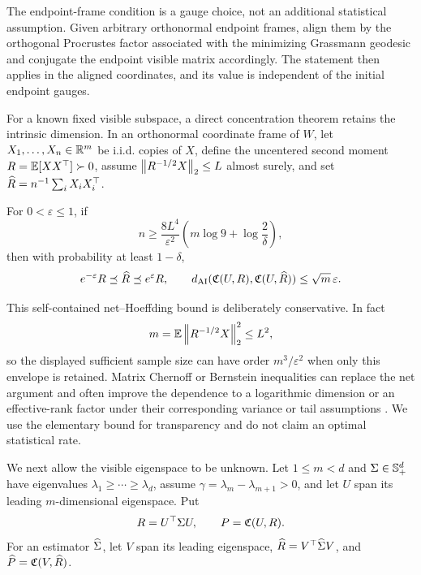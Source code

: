 The endpoint-frame condition is a gauge choice, not an additional statistical
assumption.  Given arbitrary orthonormal endpoint frames, align them by the
orthogonal Procrustes factor associated with the minimizing Grassmann geodesic
and conjugate the endpoint visible matrix accordingly.  The statement then
applies in the aligned coordinates, and its value is independent of the
initial endpoint gauges.

For a known fixed visible subspace, a direct concentration theorem retains
the intrinsic dimension.  In an orthonormal coordinate frame of \(W\), let
\(X_1,\ldots,X_n\in\mathbb R^m\) be i.i.d. copies of \(X\), define the uncentered
second moment \(R=\mathbb E[XX^\top]\succ0\), assume
\(\left\lVert R^{-1/2}X\right\rVert_2\le L\) almost surely, and set
\(\widehat R=n^{-1}\sum_iX_iX_i^\top\).

\begin{theorem}
\label{thm:known-subspace-recovery}
For \(0<\varepsilon\le1\), if
\begin{equation}
  n\ge
  \frac{8L^4}{\varepsilon^2}
  \left(m\log9+\log\frac{2}{\delta}\right),
  \label{eq:known-subspace-sample-size}
\end{equation}
then with probability at least \(1-\delta\),
\begin{equation}
  e^{-\varepsilon}R\preceq\widehat R\preceq e^\varepsilon R,
  \qquad
  d_{\mathrm{AI}}(\mathfrak C(U,R),\mathfrak C(U,\widehat R))\le\sqrt m\,\varepsilon.
  \label{eq:known-subspace-bound}
\end{equation}
\end{theorem}

This self-contained net--Hoeffding bound is deliberately conservative.  In
fact
\[
  m=\mathbb E\left\lVert R^{-1/2}X\right\rVert_2^2\le L^2,
\]
so the displayed sufficient sample size can have order
\(m^3/\varepsilon^2\) when only this envelope is retained.  Matrix
Chernoff or Bernstein inequalities can replace the net argument and often
improve the dependence to a logarithmic dimension or an effective-rank
factor under their corresponding variance or tail assumptions
\citep{tropp2015matrix}.  We use the elementary bound for transparency and
do not claim an optimal statistical rate.

We next allow the visible eigenspace to be unknown.  Let \(1\le m<d\) and
\(\Sigma\in\mathbb S_{+}^d\) have eigenvalues
\(\lambda_1\ge\cdots\ge\lambda_d\), assume
\(\gamma=\lambda_m-\lambda_{m+1}>0\), and let \(U\) span its leading
\(m\)-dimensional eigenspace.  Put
\[
  R=U^\top\Sigma U,
  \qquad
  P=\mathfrak C(U,R).
\]
For an estimator \(\widehat\Sigma\), let \(V\) span its leading eigenspace,
\(\widehat R=V^\top\widehat\Sigma V\), and \(\widehat P=\mathfrak C(V,\widehat R)\).

